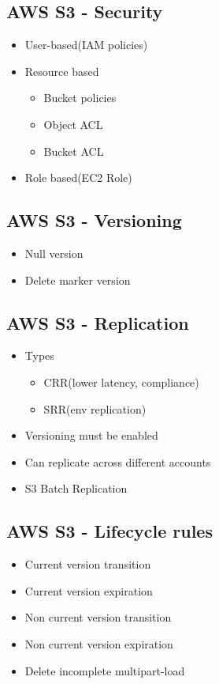 \documentclass[../main.tex]{subfiles}
\begin{document}
\subsection{AWS S3 - Security}
\begin{itemize}
    \item User-based(IAM policies)
    \item Resource based
    \begin{itemize}
        \item Bucket policies
        \item Object ACL
        \item Bucket ACL
    \end{itemize}
    \item Role based(EC2 Role)
\end{itemize}

\subsection{AWS S3 - Versioning}
\begin{itemize}
    \item Null version
    \item Delete marker version
\end{itemize}

\subsection{AWS S3 - Replication}
\begin{itemize}
    \item Types
    \begin{itemize}
        \item CRR(lower latency, compliance)
        \item SRR(env replication)
    \end{itemize}
    \item Versioning must be enabled
    \item Can replicate across different accounts
    \item S3 Batch Replication
\end{itemize}

\subsection{AWS S3 - Lifecycle rules}
\begin{itemize}
    \item Current version transition
    \item Current version expiration
    \item Non current version transition
    \item Non current version expiration
    \item Delete incomplete multipart-load
\end{itemize}
\end{document}
